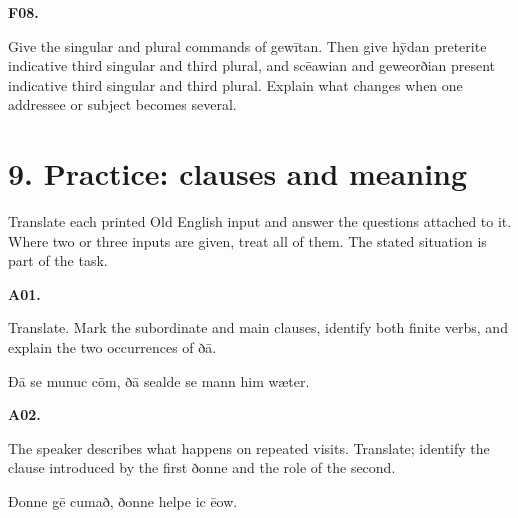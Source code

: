 \par\begin{minipage}{\linewidth}\raggedright
\textbf{F08.}

Give the singular and plural commands of gewītan. Then give hȳdan preterite indicative third singular and third plural, and scēawian and geweorðian present indicative third singular and third plural. Explain what changes when one addressee or subject becomes several.

\end{minipage}\par\addvspace{4pt}

\section*{9. Practice: clauses and meaning}

Translate each printed Old English input and answer the questions attached to it. Where two or three inputs are given, treat all of them. The stated situation is part of the task.

\par\begin{minipage}{\linewidth}\raggedright
\textbf{A01.}

Translate. Mark the subordinate and main clauses, identify both finite verbs, and explain the two occurrences of ðā.

Ðā se munuc cōm, ðā sealde se mann him wæter.

\end{minipage}\par\addvspace{4pt}

\par\begin{minipage}{\linewidth}\raggedright
\textbf{A02.}

The speaker describes what happens on repeated visits. Translate; identify the clause introduced by the first ðonne and the role of the second.

Ðonne gē cumað, ðonne helpe ic ēow.

\end{minipage}\par\addvspace{4pt}

